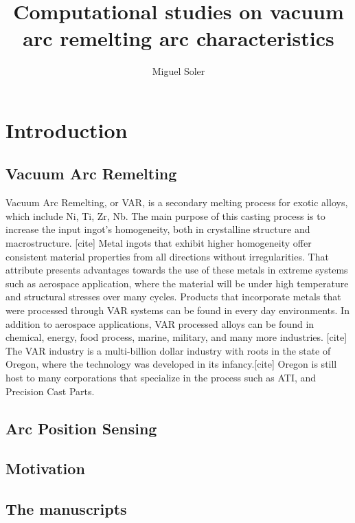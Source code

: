 \documentclass[onehalf,11pt]{beavtex}
\title{Computational studies on vacuum arc remelting arc characteristics}
\author{Miguel Soler}
\begin{document}
\maketitle

\mainmatter

\chapter{Introduction}



\section{Vacuum Arc Remelting}

Vacuum Arc Remelting, or VAR, is a secondary melting process for exotic alloys, which include Ni, Ti, Zr, Nb.
The main purpose of this casting process is to increase the input ingot's homogeneity, both in crystalline structure and macrostructure. [cite]
Metal ingots that exhibit higher homogeneity offer consistent material properties from all directions without irregularities. 
That attribute presents advantages towards the use of these metals in extreme systems such as aerospace application, where the material will be under high temperature and structural stresses over many cycles. 
Products that incorporate metals that were processed through VAR systems can be found in every day environments. 
In addition to aerospace applications, VAR processed alloys can be found in chemical, energy, food process, marine, military, and many more industries. [cite]
The VAR industry is a multi-billion dollar industry with roots in the state of Oregon, where the technology was developed in its infancy.[cite]
Oregon is still host to many corporations that specialize in the process such as ATI, and Precision Cast Parts. 








\section{Arc Position Sensing}

\section{Motivation}

\section{The manuscripts}
\end{document}
